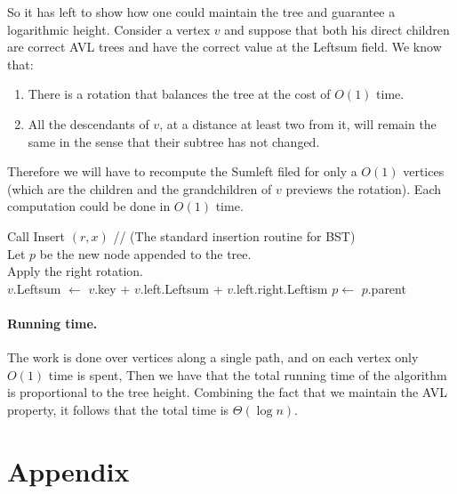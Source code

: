 So it has left to show how one could maintain the tree and guarantee a logarithmic height. Consider a vertex $v$ and suppose that both
his direct children are correct AVL trees and have the correct value at the Leftsum field. We know that:
\begin{enumerate}
  \item There is a rotation that balances the tree at the cost of $O(1)$ time.
  \item All the descendants of $v$, at a distance at least two from it,  will remain the same in the sense that their subtree has not changed. 
\end{enumerate}
Therefore we will have to recompute the Sumleft filed for only a $O(1)$ vertices (which are the children and the grandchildren of $v$ previews the rotation). 
Each computation could be done in $O(1)$ time. 



  \begin{algorithm}[H]
    Call Insert $(r,x)$ // (The standard insertion routine for BST) \\  
    Let $p$ be the new node appended to the tree. \\
     {
      Apply the right rotation. \\
       {
	$v$.Leftsum $\leftarrow$ $v$.key + $v$.left.Leftsum + $v$.left.right.Leftism 		
      }
      $p \leftarrow$ $p$.parent \\  
    }
  \end{algorithm}


\paragraph{Running time.} The work is done over vertices along a single path, and on each vertex only $O(1)$ time 
is spent, Then we have that the total running time of the algorithm is proportional to the tree height. 
Combining the fact that we maintain the AVL property, it follows that the total time is $\Theta\left( \log n \right)$.  




\section*{Appendix}
